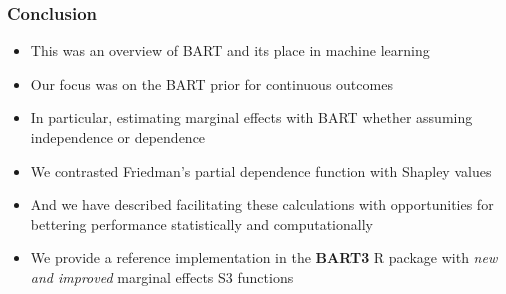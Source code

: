 \documentclass[11pt,dvipsnames,usenames,times]{beamer}
\begin{document}
\begin{frame}\frametitle{Conclusion}
\begin{itemize}
\item This was an overview of BART and its place in machine learning
\item Our focus was on the BART prior for continuous outcomes
\item In particular, estimating marginal effects with BART
whether assuming independence or dependence
\item We contrasted Friedman's partial dependence
function with Shapley values
\item And we have described facilitating these
calculations with opportunities for bettering performance
statistically and computationally
\item We provide a reference implementation in the {\bf BART3} R package with {\it new and improved} marginal effects S3 functions
\end{itemize}
 \end{frame}
\end{document}
